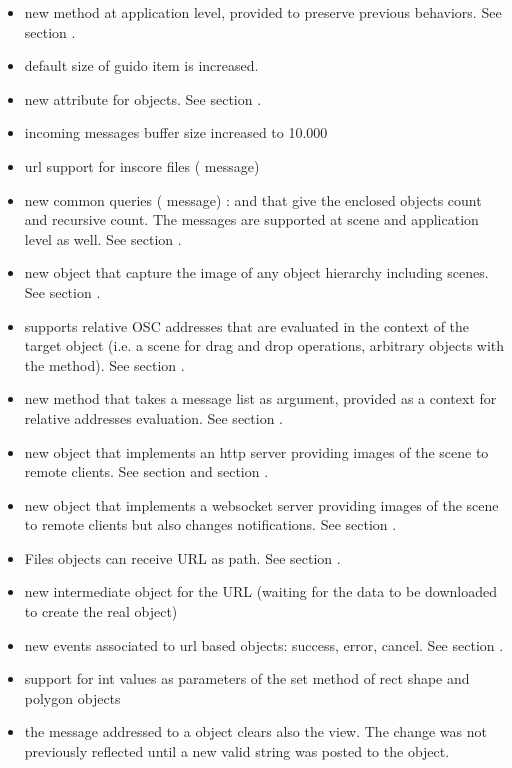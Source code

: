 

\begin{itemize}
\item new  method at application level, provided to preserve previous behaviors. See section .
\item default size of guido item is increased.
\item new  attribute for  objects. See section .
\item incoming messages buffer size increased to 10.000
\item url support for inscore files ( message)

\item new common queries ( message) :  and  that give the enclosed objects count and recursive count. The messages are supported at scene and application level as well. See section .
\item new  object that capture the image of any object hierarchy including scenes. See section .
\item supports relative OSC addresses that are evaluated in the context of the target object 
  (i.e. a scene for drag and drop operations, arbitrary objects with the  method). See section .
\item new  method that takes a message list as argument, provided as a context for relative addresses evaluation. See section .
\item new  object that implements an http server providing images of the scene to remote clients. See section  and section .
\item new  object that implements a websocket server providing images of the scene to remote clients but also changes notifications. See section .

\item  Files objects can receive URL as path. See section .
\item new intermediate object for the URL (waiting for the data to be downloaded to create the real object)
\item new events associated to url based objects: success, error, cancel. See section .
\item  support for int values as parameters of the set method of rect shape and polygon objects
\item  the  message addressed to a  object clears also the view. The change was not previously reflected until a new valid string was posted to the object.



\end{itemize}
